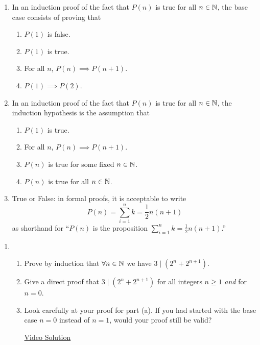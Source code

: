 \pagestyle{empty}


\begin{enumerate}
  \item In an induction proof of the fact that $P(n)$ is true for all $n \in \mathbb{N}$, the base case consists of proving that
	\begin{enumerate}
		\item $P(1)$ is false.
		\item $P(1)$ is true.
		\item For all $n$, $P(n) \implies P(n+1)$.
		\item $P(1) \implies P(2)$.
	\end{enumerate}
    
	\item In an induction proof of the fact that $P(n)$ is true for all $n \in \mathbb{N}$, the induction hypothesis is the assumption that
	\begin{enumerate}
		\item $P(1)$ is true.
		\item For all $n$, $P(n) \implies P(n+1)$.
		\item $P(n)$ is true for some fixed $n \in \mathbb{N}$.
		\item $P(n)$ is true for all $n \in \mathbb{N}$.
	\end{enumerate}
    
	\item True or False: in formal proofs, it is acceptable to write
  \[
		P(n)=\sum_{i=1}^n k=\frac{1}{2}n(n+1)
  \]
  as shorthand for ``$P(n)$ is the proposition $\sum_{i=1}^nk=\frac 12n(n+1)$.''
\end{enumerate}



\begin{enumerate}
	\item\begin{enumerate}
    \item Prove by induction that $\forall n\in\mathbb{N}$ we have $3\mid(2^n+2^{n+1})$.
    \item Give a direct proof that $3\mid(2^n+2^{n+1})$ for all integers $n\ge 1$ \emph{and} for $n=0$.
    \item Look carefully at your proof for part (a). If you had started with the base case $n=0$ instead of $n=1$, would your proof still be valid?
    
    \href{https://youtu.be/Z4qxw2YTLzI}{Video Solution}
  \end{enumerate}
\end{enumerate}

